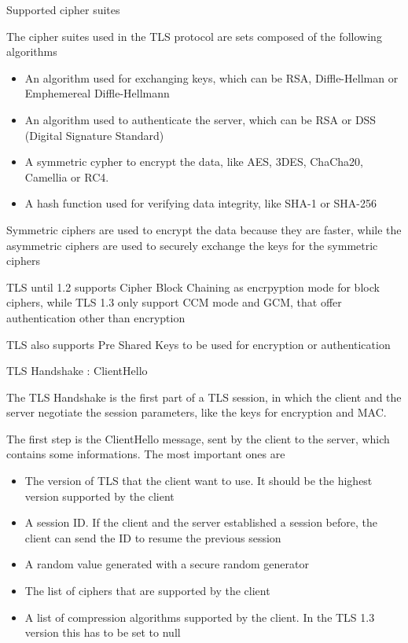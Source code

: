 \begin{frame}{Supported cipher suites}
	
	The cipher suites used in the TLS protocol are sets composed of the following algorithms
	
	\begin{itemize}
		\item An algorithm used for exchanging keys, which can be RSA, Diffle-Hellman or Emphemereal Diffle-Hellmann
		\item An algorithm used to authenticate the server, which can be RSA or DSS (Digital Signature Standard)
		\item A symmetric cypher to encrypt the data, like AES, 3DES, ChaCha20, Camellia or RC4. 
		\item A hash function used for verifying data integrity, like SHA-1 or SHA-256
	\end{itemize}
	
	Symmetric ciphers are used to encrypt the data because they are faster, while the asymmetric ciphers are used to securely exchange the keys for the symmetric ciphers
	
	TLS until 1.2 supports Cipher Block Chaining as encrpyption mode for block ciphers, while TLS 1.3 only support CCM mode and GCM, that offer authentication other than encryption
	
	TLS also supports Pre Shared Keys to be used for encryption or authentication
	
\end{frame}

\begin{frame}{TLS Handshake : ClientHello}
	
The TLS Handshake is the first part of a TLS session, in which the client and the server negotiate the session parameters, like the keys for encryption and MAC.

The first step is the ClientHello message, sent by the client to the server, which contains some informations. The most important ones are

\begin{itemize}
	\item The version of TLS that the client want to use. It should be the highest version supported by the client
	\item A session ID. If the client and the server established a session before, the client can send the ID to resume the previous session
	\item A random value generated with a secure random generator
	\item The list of ciphers that are supported by the client
	\item A list of compression algorithms supported by the client. In the TLS 1.3 version this has to be set to null
\end{itemize}
	
\end{frame}

